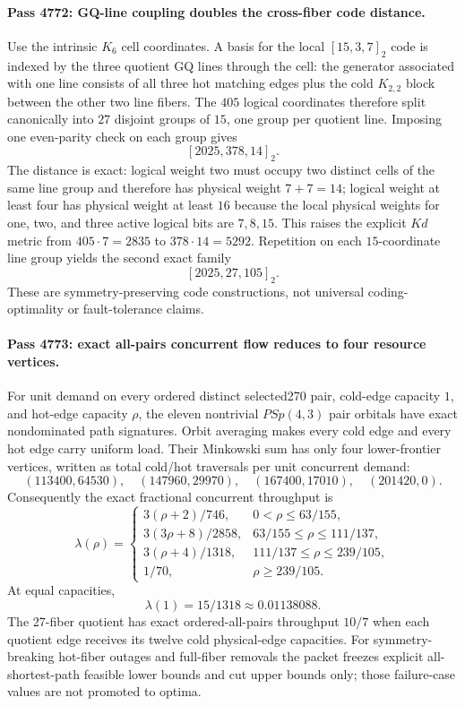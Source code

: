 \paragraph{Pass 4772: GQ-line coupling doubles the cross-fiber code distance.}
Use the intrinsic $K_6$ cell coordinates.  A basis for the local $[15,3,7]_2$ code is indexed by the three quotient GQ lines through the cell: the generator associated with one line consists of all three hot matching edges plus the cold $K_{2,2}$ block between the other two line fibers.  The $405$ logical coordinates therefore split canonically into $27$ disjoint groups of $15$, one group per quotient line.  Imposing one even-parity check on each group gives
\[
 \boxed{[2025,378,14]_2}.
\]
The distance is exact: logical weight two must occupy two distinct cells of the same line group and therefore has physical weight $7+7=14$; logical weight at least four has physical weight at least $16$ because the local physical weights for one, two, and three active logical bits are $7,8,15$.  This raises the explicit $K d$ metric from $405\cdot7=2835$ to $378\cdot14=5292$.  Repetition on each $15$-coordinate line group yields the second exact family
\[
 \boxed{[2025,27,105]_2}.
\]
These are symmetry-preserving code constructions, not universal coding-optimality or fault-tolerance claims.

\paragraph{Pass 4773: exact all-pairs concurrent flow reduces to four resource vertices.}
For unit demand on every ordered distinct selected270 pair, cold-edge capacity $1$, and hot-edge capacity $\rho$, the eleven nontrivial $PSp(4,3)$ pair orbitals have exact nondominated path signatures.  Orbit averaging makes every cold edge and every hot edge carry uniform load.  Their Minkowski sum has only four lower-frontier vertices, written as total cold/hot traversals per unit concurrent demand:
\[
 (113400,64530),\quad(147960,29970),\quad(167400,17010),\quad(201420,0).
\]
Consequently the exact fractional concurrent throughput is
\[
 \lambda(\rho)=
 \begin{cases}
  3(\rho+2)/746,&0<\rho\le 63/155,\\
  3(3\rho+8)/2858,&63/155\le\rho\le111/137,\\
  3(\rho+4)/1318,&111/137\le\rho\le239/105,\\
  1/70,&\rho\ge239/105.
 \end{cases}
\]
At equal capacities,
\[
 \boxed{\lambda(1)=15/1318\approx0.01138088}.
\]
The 27-fiber quotient has exact ordered-all-pairs throughput $10/7$ when each quotient edge receives its twelve cold physical-edge capacities.  For symmetry-breaking hot-fiber outages and full-fiber removals the packet freezes explicit all-shortest-path feasible lower bounds and cut upper bounds only; those failure-case values are not promoted to optima.

